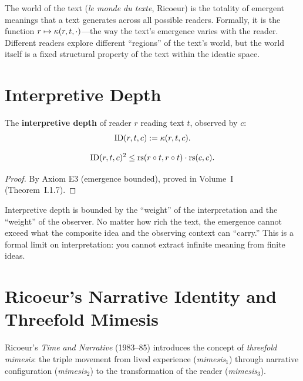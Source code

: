 \begin{interpretation}
The world of the text (\textit{le monde du texte}, Ricoeur) is the totality of
emergent meanings that a text generates across all possible readers. Formally,
it is the function $r \mapsto \kappa(r, t, \cdot)$---the way the text's
emergence varies with the reader. Different readers explore different ``regions''
of the text's world, but the world itself is a fixed structural property of the
text within the ideatic space.
\end{interpretation}

\section{Interpretive Depth}

\begin{definition}
\label{def:interpretive-depth}
The \textbf{interpretive depth} of reader $r$ reading text $t$, observed by $c$:
\[
\mathrm{ID}(r, t, c) := \kappa(r, t, c).
\]
\end{definition}

\begin{theorem}
\label{thm:id-bounded}
\[
\mathrm{ID}(r, t, c)^2 \leq \mathrm{rs}(r \circ t, r \circ t) \cdot \mathrm{rs}(c, c).
\]
\end{theorem}

\begin{proof}
By Axiom E3 (emergence bounded), proved in Volume~I (Theorem~I.1.7).
\end{proof}

\begin{interpretation}
Interpretive depth is bounded by the ``weight'' of the interpretation and the
``weight'' of the observer. No matter how rich the text, the emergence cannot
exceed what the composite idea and the observing context can ``carry.'' This is
a formal limit on interpretation: you cannot extract infinite meaning from finite
ideas.
\end{interpretation}

\section{Ricoeur's Narrative Identity and Threefold Mimesis}

Ricoeur's \textit{Time and Narrative} (1983--85) introduces the concept of
\emph{threefold mimesis}: the triple movement from lived experience
(\textit{mimesis}$_1$) through narrative configuration (\textit{mimesis}$_2$)
to the transformation of the reader (\textit{mimesis}$_3$).

